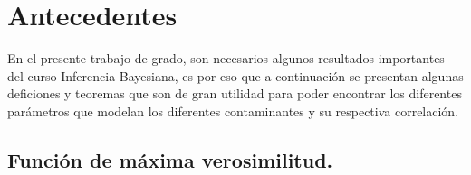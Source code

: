 \chapter{Antecedentes}

En el presente trabajo de grado, son necesarios algunos resultados importantes del curso Inferencia Bayesiana, es por eso que a continuación se presentan algunas deficiones y teoremas que son de gran utilidad para poder encontrar los diferentes parámetros que modelan los diferentes contaminantes y su respectiva correlación. 

\section{Función de máxima verosimilitud.}
